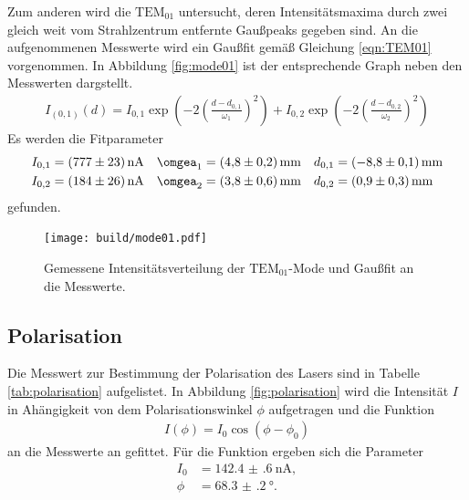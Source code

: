 Zum anderen wird die \textbf{$\text{TEM}_{01}$} untersucht, deren Intensitätsmaxima durch
zwei gleich weit vom Strahlzentrum entfernte Gaußpeaks gegeben sind.
An die aufgenommenen Messwerte wird ein Gaußfit gemäß Gleichung \ref{eqn:TEM01} vorgenommen.
In Abbildung \ref{fig:mode01} ist der entsprechende Graph neben den Messwerten dargstellt.
\begin{align}
  I_{(0,1)}(d)=I_{0,1}\exp\left(-2\left(\frac{d-d_{0,1}}{\omega_1}\right)^2\right)+I_{0,2}\exp\left(-2\left(\frac{d-d_{0,2}}{\omega_2}\right)^2\right) \label{eqn:TEM01asy}
\end{align}
Es werden die Fitparameter
 \begin{align}
   I_{0,1}&=\SI{777(23)}{\nano\ampere}& \omgea_{1}&=\SI{4.8(2)}{\milli\meter} &   d_{0,1}&=\SI{-8.8(1)}{\milli\meter}\\
   I_{0,2}&=\SI{184(26)}{\nano\ampere}& \omgea_{2}&=\SI{3.8(6)}{\milli\meter} &   d_{0,2}&=\SI{0.9(3)}{\milli\meter}
 \end{align}
gefunden.
\begin{figure}
  \centering
  \texttt{[image: build/mode01.pdf]}
  \caption{Gemessene Intensitätsverteilung der \textbf{$\text{TEM}_{01}$}-Mode und Gaußfit an die Messwerte.}
  \label{fig:plot}
\end{figure}



\subsection{Polarisation}
\label{subsec:Polarisation}
Die Messwert zur Bestimmung der Polarisation des Lasers sind in Tabelle \ref{tab:polarisation} aufgelistet.
In Abbildung \ref{fig:polarisation} wird die Intensität $I$ in Ahängigkeit von dem Polarisationswinkel $\phi$
aufgetragen und die Funktion
\begin{align}
I(\phi)=I_0 \cos\left(\phi-\phi_0\right)
\end{align}
an die Messwerte an gefittet.
Für die Funktion ergeben sich die Parameter
\begin{align}
I_0  & = \SI{142.4(6)}{\nano\ampere},\\
\phi & = \SI{68.3(2)}{\degree}.
\end{align}

